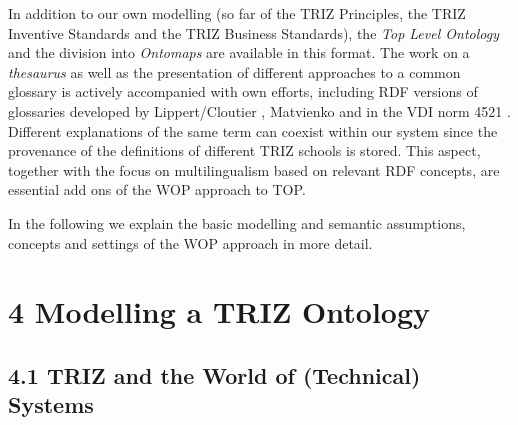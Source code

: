 \documentclass[12pt,a4paper]{article}
\begin{document}
In addition to our own modelling (so far of the TRIZ Principles, the TRIZ
Inventive Standards and the TRIZ Business Standards), the \emph{Top Level
  Ontology} and the division into \emph{Ontomaps} are available in this
format. The work on a \emph{thesaurus} as well as the presentation of
different approaches to a common glossary is actively accompanied with own
efforts, including RDF versions of glossaries developed by Lippert/Cloutier
\cite{13}, Matvienko \cite{16} and in the VDI norm 4521 \cite{24}. Different
explanations of the same term can coexist within our system since the
provenance of the definitions of different TRIZ schools is stored. This
aspect, together with the focus on multilingualism based on relevant RDF
concepts, are essential add ons of the WOP approach to TOP.

In the following we explain the basic modelling and semantic assumptions,
concepts and settings of the WOP approach in more detail.

\section*{4 Modelling a TRIZ Ontology}

\subsection*{4.1 TRIZ and the World of (Technical) Systems}
\end{document}
